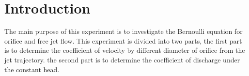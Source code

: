 \section{Introduction}
\label{sec:introduction}
\FloatBarrier %
The main purpose of this experiment is to investigate the Bernoulli equation for orifice and free jet flow.
This experiment is divided into two parts, the first part is to determine the coefficient of 
velocity by different diameter of orifice from the jet trajectory.
the second part is to determine the coefficient of discharge under the constant head.
